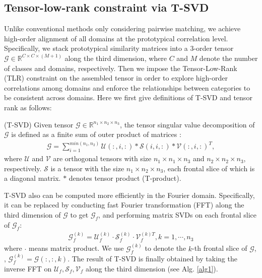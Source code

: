 \documentclass[10pt,twocolumn,letterpaper]{article}
\begin{document}
\subsection{Tensor-low-rank constraint via T-SVD}
\label{sec3.2}
Unlike conventional methods only considering pairwise matching, we achieve high-order alignment of all domains at the prototypical correlation level. Specifically, we stack prototypical similarity matrices into a 3-order tensor ${\mathcal{G}} \in {\mathbb{R}}^{C\times C \times (M+1)}$ along the third dimension, where $C$ and $M$ denote the number of classes and domains, respectively. Then we impose the Tensor-Low-Rank (TLR) constraint on the assembled tensor in order to explore high-order correlations among domains and enforce the relationships between categories to be consistent across domains. Here we first give definitions of T-SVD and tensor rank as follows:\par
\begin{definition}
	(T-SVD) Given tensor ${\mathcal{G}} \in {\mathbb{R}}^{n_1\times n_2 \times n_3}$, the tensor singular value decomposition of ${\mathcal{G}}$ is defined as a finite sum of outer product of matrices \cite{martin2013an}:
	\begin{align}
		\mathcal{G}=\sum_{i=1}^{min(n_1,n_2)}\mathcal{U}(:,i,:)*\mathcal{S}(i,i,:)*\mathcal{V}(:,i,:)^T,
	\end{align}
	where $\mathcal{U}$ and $\mathcal{V}$ are orthogonal tensors with size $n_1\times n_1\times n_3$ and $n_2\times n_2\times n_3$, respectively. $\mathcal{S}$ is a tensor with the size $n_1\times n_2\times n_3$, each frontal slice of which is a diagonal matrix. $*$ denotes tensor product (T-product). 
\end{definition}\par
T-SVD also can be computed more efficiently in the Fourier domain. Specifically, it can be replaced by conducting fast Fourier transformation (FFT) along the third dimension of $\mathcal{G}$ to get $\mathcal{G}_f$, and performing matrix SVDs on each frontal slice of $\mathcal{G}_f$:
\begin{align}
	\label{eq8}
	\mathcal{G}_f^{(k)} = \mathcal{U}_f^{(k)}\cdot \mathcal{S}_f^{(k)} \cdot \mathcal{V}_f^{(k)T},k=1,\cdots,n_3
\end{align}
where $\cdot$ means matrix product. We use $\mathcal{G}_f^{(k)}$ to denote the $k$-th frontal slice of $\mathcal{G}$, \ie, $\mathcal{G}_f^{(k)} = \mathcal{G}(:,:,k)$. The result of T-SVD is finally obtained by taking the inverse FFT on $\mathcal{U}_f, \mathcal{S}_f, \mathcal{V}_f$ along the third dimension (see Alg. \ref{alg1}).
\end{document}
